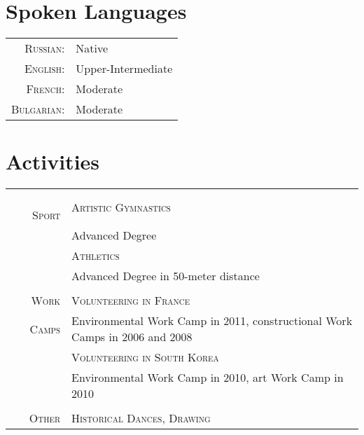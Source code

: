 \documentclass[a4paper,10pt]{article}
\begin{document}
\section{Spoken Languages}
\begin{tabular}{rl}
\textsc{Russian:}&Native\\
\textsc{English:}&Upper-Intermediate\\
\textsc{French:}&Moderate\\
\textsc{Bulgarian:}&Moderate\\
\end{tabular}

\section{Activities}
\begin{tabular}{r|p{13cm}}
 \textcolor{white}{11111} \textsc{Sport}& \textsc{Artistic Gymnastics}\\
 & \footnotesize Advanced Degree\\
 & \textsc{Athletics}\\
 & \footnotesize Advanced Degree in 50-meter distance\\
 
\multicolumn{2}{c}{} \\
 
 \textsc{Work} & \textsc{Volunteering in France}\\
 \textsc{Camps} & \footnotesize Environmental Work Camp in 2011, constructional Work Camps in 2006 and 2008 \\
 & \textsc{Volunteering in South Korea}\\
 & \footnotesize Environmental Work Camp in 2010, art Work Camp in 2010 \\
 
\multicolumn{2}{c}{} \\
 
 \textsc{Other} & \textsc{Historical Dances, Drawing} \\
\end{tabular}
\end{document}
